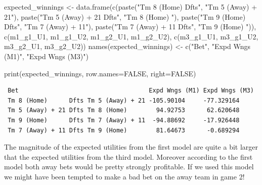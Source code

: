 \documentclass[
  letterpaper,
  DIV=11,
  numbers=noendperiod]{scrartcl}
\newenvironment{Shaded}{\begin{snugshade}}{\end{snugshade}}
\newcommand{\AttributeTok}[1]{\textcolor[rgb]{0.40,0.45,0.13}{#1}}
\newcommand{\ConstantTok}[1]{\textcolor[rgb]{0.56,0.35,0.01}{#1}}
\newcommand{\FunctionTok}[1]{\textcolor[rgb]{0.28,0.35,0.67}{#1}}
\newcommand{\NormalTok}[1]{\textcolor[rgb]{0.00,0.23,0.31}{#1}}
\newcommand{\OtherTok}[1]{\textcolor[rgb]{0.00,0.23,0.31}{#1}}
\newcommand{\StringTok}[1]{\textcolor[rgb]{0.13,0.47,0.30}{#1}}
\begin{document}
\begin{Shaded}
\begin{Highlighting}[]
\NormalTok{expected\_winnings }\OtherTok{\textless{}{-}} \FunctionTok{data.frame}\NormalTok{(}\FunctionTok{c}\NormalTok{(}\FunctionTok{paste}\NormalTok{(}\StringTok{"Tm 8 (Home)      Dfts"}\NormalTok{,}
                                        \StringTok{"Tm 5 (Away) + 21"}\NormalTok{),}
                                  \FunctionTok{paste}\NormalTok{(}\StringTok{"Tm 5 (Away) + 21 Dfts"}\NormalTok{,}
                                        \StringTok{"Tm 8 (Home)    "}\NormalTok{),}
                                  \FunctionTok{paste}\NormalTok{(}\StringTok{"Tm 9 (Home)      Dfts"}\NormalTok{,}
                                        \StringTok{"Tm 7 (Away) + 11"}\NormalTok{),}
                                  \FunctionTok{paste}\NormalTok{(}\StringTok{"Tm 7 (Away) + 11 Dfts"}\NormalTok{,}
                                        \StringTok{"Tm 9 (Home)    "}\NormalTok{)),}
                                \FunctionTok{c}\NormalTok{(m1\_g1\_U1, m1\_g1\_U2,}
\NormalTok{                                  m1\_g2\_U1, m1\_g2\_U2),}
                                \FunctionTok{c}\NormalTok{(m3\_g1\_U1, m3\_g1\_U2,}
\NormalTok{                                  m3\_g2\_U1, m3\_g2\_U2))}
\FunctionTok{names}\NormalTok{(expected\_winnings) }\OtherTok{\textless{}{-}} \FunctionTok{c}\NormalTok{(}\StringTok{"Bet"}\NormalTok{,}
                              \StringTok{"Expd Wngs (M1)"}\NormalTok{,}
                              \StringTok{"Expd Wngs (M3)"}\NormalTok{)}

\FunctionTok{print}\NormalTok{(expected\_winnings, }\AttributeTok{row.names=}\ConstantTok{FALSE}\NormalTok{, }\AttributeTok{right=}\ConstantTok{FALSE}\NormalTok{)}
\end{Highlighting}
\end{Shaded}

\begin{verbatim}
 Bet                                    Expd Wngs (M1) Expd Wngs (M3)
 Tm 8 (Home)      Dfts Tm 5 (Away) + 21 -105.90104     -77.329164    
 Tm 5 (Away) + 21 Dfts Tm 8 (Home)        94.92753      62.620648    
 Tm 9 (Home)      Dfts Tm 7 (Away) + 11  -94.88692     -17.926448    
 Tm 7 (Away) + 11 Dfts Tm 9 (Home)        81.64673      -0.689294    
\end{verbatim}

The magnitude of the expected utilities from the first model are quite a
bit larger that the expected utilities from the third model. Moreover
according to the first model both away bets would be pretty strongly
profitable. If we used this model we might have been tempted to make a
bad bet on the away team in game 2!
\end{document}
